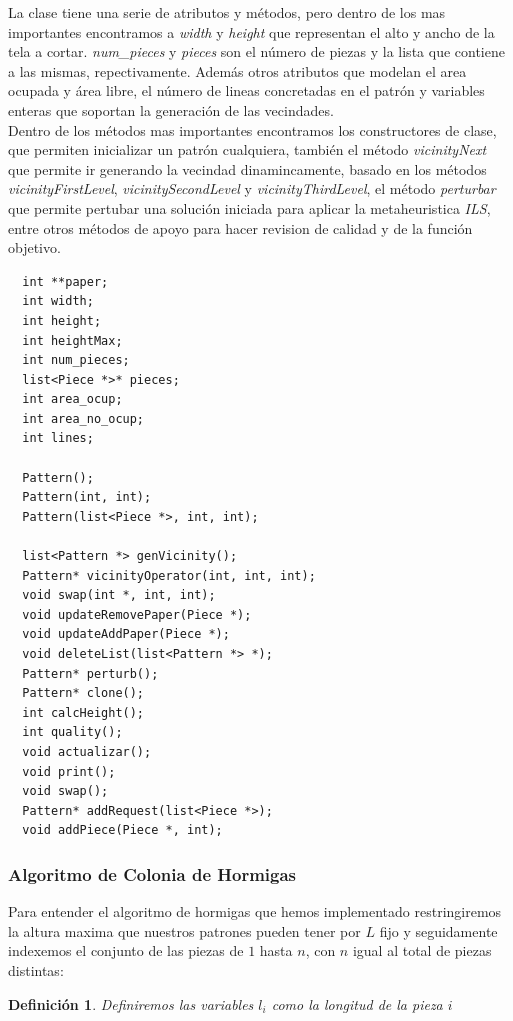 \documentclass[letterpaper,11pt]{article}
\newtheorem*{definicion}{Definici\'on}
\begin{document}
La clase tiene una serie de atributos y m\'etodos, pero dentro de los mas importantes encontramos a \emph{width} y
\emph{height} que representan el alto y ancho de la tela a cortar. \emph{num\_pieces} y \emph{pieces} son el n\'umero
de piezas y la lista que contiene a las mismas, repectivamente. Adem\'as otros atributos que modelan el area ocupada
y \'area libre, el n\'umero de lineas concretadas en el patr\'on y variables enteras que soportan la generaci\'on de las
vecindades.\\

Dentro de los m\'etodos mas importantes encontramos los constructores de clase, que permiten inicializar un patr\'on cualquiera, tambi\'en el m\'etodo \emph{vicinityNext} que permite ir generando la vecindad dinamincamente, basado en
los m\'etodos \emph{vicinityFirstLevel}, \emph{vicinitySecondLevel} y \emph{vicinityThirdLevel}, el m\'etodo \emph{perturbar} que permite pertubar una soluci\'on iniciada para aplicar la metaheuristica \emph{ILS}, entre otros m\'etodos de apoyo para hacer revision de calidad y de la funci\'on objetivo.

\begin{verbatim}
  int **paper;
  int width;
  int height;
  int heightMax;
  int num_pieces;
  list<Piece *>* pieces;
  int area_ocup;
  int area_no_ocup;
  int lines;
  
  Pattern();
  Pattern(int, int);
  Pattern(list<Piece *>, int, int);

  list<Pattern *> genVicinity();
  Pattern* vicinityOperator(int, int, int);
  void swap(int *, int, int);
  void updateRemovePaper(Piece *);
  void updateAddPaper(Piece *);
  void deleteList(list<Pattern *> *);
  Pattern* perturb();
  Pattern* clone();
  int calcHeight();
  int quality();
  void actualizar();
  void print();
  void swap();
  Pattern* addRequest(list<Piece *>);
  void addPiece(Piece *, int);
\end{verbatim}

\subsubsection{Algoritmo de Colonia de Hormigas}

Para entender el algoritmo de hormigas que hemos implementado restringiremos la altura maxima 
que nuestros patrones pueden tener por $L$ fijo y seguidamente indexemos el conjunto de las piezas de $1$ hasta $n$, 
con $n$ igual al total de piezas distintas:

\begin{definicion}
Definiremos las variables $l_i$ como la longitud de la pieza $i$
\end{definicion}
\end{document}

